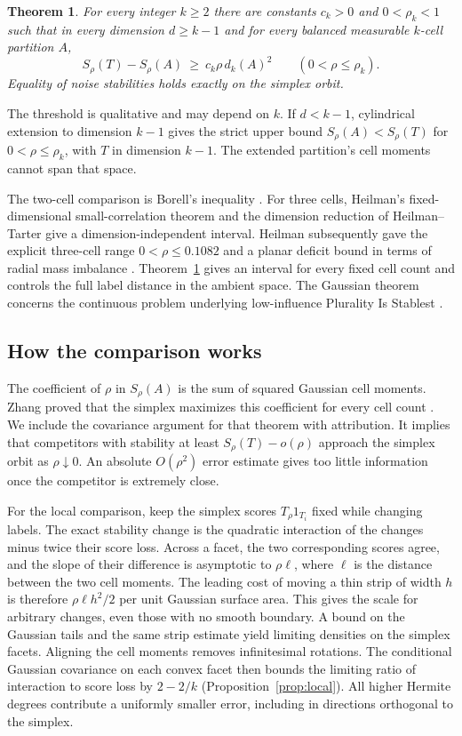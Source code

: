 \documentclass[11pt,reqno]{amsart}
\newtheorem{theorem}{Theorem}[section]
\begin{document}
\begin{theorem}\label{thm:main}
For every integer $k\ge2$ there are constants $c_k>0$ and
$0<\rho_k<1$ such that in every dimension $d\ge k-1$ and for every
balanced measurable $k$-cell partition $A$,
\[
 S_\rho(T)-S_\rho(A)\ \ge\ c_k\rho\,d_k(A)^2
                 \qquad (0<\rho\le\rho_k).
\]
Equality of noise stabilities holds exactly on the simplex orbit.
\end{theorem}

The threshold is qualitative and may depend on $k$. If $d<k-1$,
cylindrical extension to dimension $k-1$ gives the strict upper bound
$S_\rho(A)<S_\rho(T)$ for $0<\rho\le\rho_k$, with $T$ in dimension
$k-1$. The extended partition's cell moments cannot span that space.

The two-cell comparison is Borell's inequality
\cite[Introduction]{HT}. For three cells, Heilman's fixed-dimensional
small-correlation theorem \cite{Heilman14} and the dimension reduction
of Heilman--Tarter \cite[Theorems~1.9--1.10]{HT} give a
dimension-independent interval. Heilman subsequently gave the explicit
three-cell range $0<\rho\le0.1082$ and a planar deficit bound in terms
of radial mass imbalance \cite[Theorem~1.5]{Heilman23}.
Theorem~\ref{thm:main} gives an interval for every fixed cell count and
controls the full label distance in the ambient space.
The Gaussian theorem concerns the continuous problem underlying
low-influence Plurality Is Stablest \cite{IM}.

\subsection*{How the comparison works}
The coefficient of $\rho$ in $S_\rho(A)$ is the sum of squared Gaussian
cell moments. Zhang proved that the simplex maximizes this coefficient
for every cell count \cite{Zhang}. We include the covariance argument
for that theorem with attribution. It implies that competitors with
stability at least $S_\rho(T)-o(\rho)$ approach the simplex orbit as
$\rho\downarrow0$. An absolute $O(\rho^2)$ error estimate gives too
little information once the competitor is extremely close.

For the local comparison, keep the simplex scores $T_\rho1_{T_i}$
fixed while changing labels. The exact stability change is the quadratic
interaction of the changes minus twice their score loss. Across a facet,
the two corresponding scores agree, and the slope of their difference
is asymptotic to $\rho\ell$, where $\ell$ is the distance between the two
cell moments. The leading cost of moving a thin strip of width $h$ is
therefore $\rho\ell h^2/2$ per unit Gaussian surface area. This gives the scale for
arbitrary changes, even those with no smooth boundary. A bound on the
Gaussian tails and the same strip estimate yield limiting densities on
the simplex facets. Aligning the cell moments removes infinitesimal
rotations. The conditional Gaussian covariance on each convex facet
then bounds the limiting ratio of interaction to score loss by
$2-2/k$ (Proposition~\ref{prop:local}). All higher Hermite degrees
contribute a uniformly smaller error, including in directions
orthogonal to the simplex.
\end{document}
